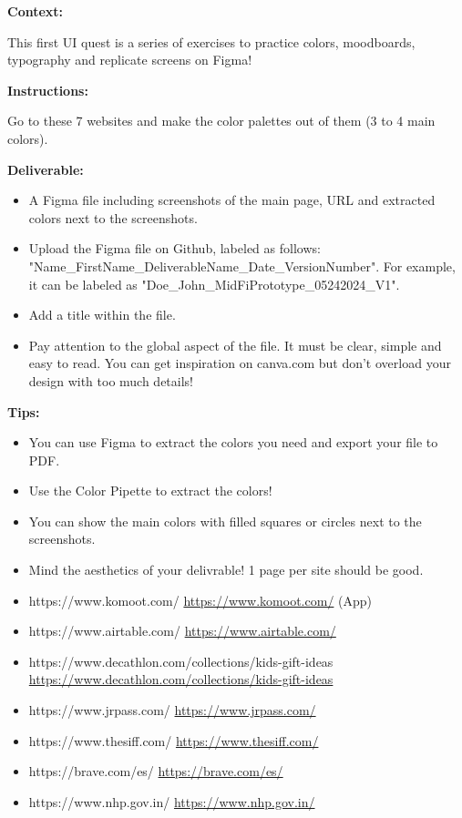 \makeheaderfiles

\textbf{Context:}

This first UI quest is a series of exercises to practice colors, moodboards, typography and replicate screens on Figma!

\textbf{Instructions:}

Go to these 7 websites and make the color palettes out of them (3 to 4 main colors).

\textbf{Deliverable:}

\begin{itemize}
\item A Figma file including screenshots of the main page, URL and extracted colors next to the screenshots.
\item Upload the Figma file on Github, labeled as follows: "Name\_FirstName\_DeliverableName\_Date\_VersionNumber". For example, it can be labeled as "Doe\_John\_MidFiPrototype\_05242024\_V1".
\item Add a title within the file.
\item Pay attention to the global aspect of the file. It must be clear, simple and easy to read. You can get inspiration on canva.com but don't overload your design with too much details!
\end{itemize}

\textbf{Tips:}

\begin{itemize}
\item You can use Figma to extract the colors you need and export your file to PDF.
\item Use the Color Pipette to extract the colors!
\item You can show the main colors with filled squares or circles next to the screenshots. 
\item Mind the aesthetics of your delivrable! 1 page per site should be good.
\end{itemize}

\begin{itemize}
\item https://www.komoot.com/ \url{https://www.komoot.com/} (App)
\item https://www.airtable.com/ \url{https://www.airtable.com/}
\item https://www.decathlon.com/collections/kids-gift-ideas \url{https://www.decathlon.com/collections/kids-gift-ideas}
\item https://www.jrpass.com/ \url{https://www.jrpass.com/}
\item https://www.thesiff.com/ \url{https://www.thesiff.com/}
\item https://brave.com/es/ \url{https://brave.com/es/}
\item https://www.nhp.gov.in/ \url{https://www.nhp.gov.in/}
\end{itemize}


